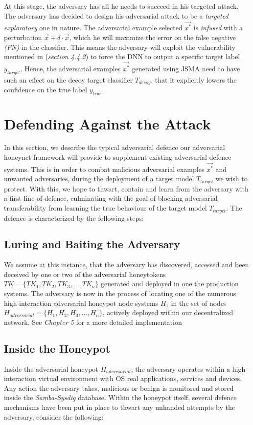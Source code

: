 \documentclass[grad,lot,lof,11pt,oneside,onehalfspace]{RUthesis}
\begin{document}
At this stage, the adversary has all he needs to succeed in his targeted attack.  The adversary has  decided  to design  his adversarial attack to be a \textit{targeted exploratory} one in nature. The adversarial example selected \textbf{$\vec{x^{*}}$} is \textit{infused} with a perturbation \textit{$\vec{x}+\delta \cdotp \vec{x}$}, which he will maximize the error on the false negative \textit{(FN)} in the classifier.  This means the adversary will exploit the vulnerability mentioned in (\textit{section 4.4.2}) to force the DNN to output a specific target label \textit{$y_{target}$}.
Hence, the adversarial examples \textbf{$\vec{x^{*}}$} generated using JSMA need to have such an effect on the decoy target classifier \textit{$T_{decoy}$}, that it explicitly lowers the confidence on the true label \textit{$y_{true}$}.
\section{Defending Against the Attack}
In this section, we describe the typical adversarial defence  our adversarial honeynet framework will provide to supplement existing adversarial defence systems. This is in order to combat malicious adversarial examples $\vec{x^{*}}$ and unwanted adversaries, during the deployment of a target model \textit{$T_{target}$} we wish to protect. With this, we hope to thwart, contain and learn from the adversary with a first-line-of-defence, culminating with the goal of blocking adversarial transferability from learning the true behaviour of the target model \textit{$T_{target}$}. The defence is characterized by the following steps:
\subsection{Luring and Baiting the Adversary}
We assume at this instance, that the adversary has discovered, accessed and been deceived by one or two of the adversarial honeytokens $TK=\{TK_{1}, TK_{2}, TK_{3},...,TK_{n}\}$ generated and deployed in one the production systems. The adversary is now in the process of locating one of the numerous high-interaction adversarial honeypot node systems $H_{1}$ in the set of nodes $H_{adversarial}=\{H_{1}, H_{2}, H_{3},...,H_{n}\}$, actively deployed within our decentralized network. See \textit{Chapter 5} for a more detailed implementation
\subsection{Inside the Honeypot}
Inside the adversarial honeypot \textit{$H_{adversarial}$}, the adversary operates within a high-interaction virtual environment with OS real applications, services and devices. Any action the adversary takes, malicious or benign is monitored and stored inside the \textit{Samba-Sysdig} database. Within the honeypot itself, several defence mechanisms have been put in place to thwart any unhanded attempts by the adversary, consider the following:
\end{document}
